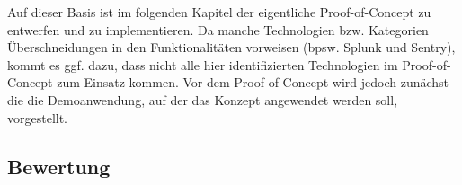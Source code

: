 

Auf dieser Basis ist im folgenden Kapitel der eigentliche Proof-of-Concept zu entwerfen und zu implementieren. Da manche Technologien bzw. Kategorien Überschneidungen in den Funktionalitäten vorweisen (bpsw. Splunk und Sentry), kommt es ggf. dazu, dass nicht alle hier identifizierten Technologien im Proof-of-Concept zum Einsatz kommen. Vor dem Proof-of-Concept wird jedoch zunächst die die Demoanwendung, auf der das Konzept angewendet werden soll, vorgestellt.

\subsection{Bewertung}